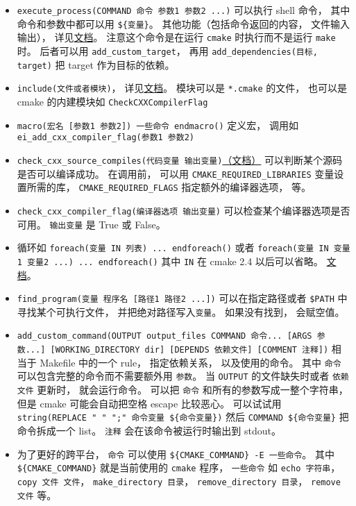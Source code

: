 \begin{itemize}
\item \verb`execute_process(COMMAND 命令 参数1 参数2 ...)` 可以执行 shell 命令， 其中命令和参数中都可以用 \verb`${变量}`。 其他功能（包括命令返回的内容， 文件输入输出）， 详见\href{https://cmake.org/cmake/help/latest/command/execute_process.html}{文档}。 注意这个命令是在运行 \verb`cmake` 时执行而不是运行 \verb`make` 时。 后者可以用 \verb`add_custom_target`， 再用 \verb`add_dependencies(目标, target)` 把 target 作为目标的依赖。
\item \verb`include(文件或者模块)`， 详见\href{https://cmake.org/cmake/help/latest/command/include.html}{文档}。 模块可以是 \verb`*.cmake` 的文件， 也可以是 cmake 的内建模块如 \verb`CheckCXXCompilerFlag`
\item \verb`macro(宏名 [参数1 参数2]) 一些命令 endmacro()` 定义宏， 调用如 \verb`ei_add_cxx_compiler_flag(参数1 参数2)`
\item \verb`check_cxx_source_compiles(代码变量 输出变量)`\href{https://cmake.org/cmake/help/latest/module/CheckCXXSourceCompiles.html}{（文档）} 可以判断某个源码是否可以编译成功。 在调用前， 可以用 \verb`CMAKE_REQUIRED_LIBRARIES` 变量设置所需的库， \verb`CMAKE_REQUIRED_FLAGS` 指定额外的编译器选项， 等。
\item \verb`check_cxx_compiler_flag(编译器选项 输出变量)` 可以检查某个编译器选项是否可用。 \verb`输出变量` 是 True 或 False。
\item 循环如 \verb`foreach(变量 IN 列表) ... endforeach()` 或者 \verb`foreach(变量 IN 变量1 变量2 ...) ... endforeach()` 其中 \verb`IN` 在 cmake 2.4 以后可以省略。 \href{https://cmake.org/cmake/help/latest/command/foreach.html}{文档}。
\item \verb`find_program(变量 程序名 [路径1 路径2 ...])` 可以在指定路径或者 \verb`$PATH` 中寻找某个可执行文件， 并把绝对路径写入\verb`变量`。 如果没有找到， 会赋空值。
\item \verb`add_custom_command(OUTPUT output_files COMMAND 命令... [ARGS 参数...] [WORKING_DIRECTORY dir] [DEPENDS 依赖文件] [COMMENT 注释])` 相当于 Makefile 中的一个 rule， 指定依赖关系， 以及使用的命令。 其中 \verb`命令` 可以包含完整的命令而不需要额外用 \verb`参数`。 当 \verb`OUTPUT` 的文件缺失时或者 \verb`依赖文件` 更新时， 就会运行命令。 可以把 \verb`命令` 和所有的参数写成一整个字符串， 但是 cmake 可能会自动把空格 escape 比较恶心。 可以试试用 \verb`string(REPLACE " " ";" 命令变量 ${命令变量})` 然后 \verb`COMMAND ${命令变量}` 把命令拆成一个 list。 \verb`注释` 会在该命令被运行时输出到 stdout。
\item 为了更好的跨平台， \verb`命令` 可以使用 \verb`${CMAKE_COMMAND} -E 一些命令`。 其中 \verb`${CMAKE_COMMAND}` 就是当前使用的 \verb`cmake` 程序， \verb`一些命令` 如 \verb`echo 字符串`，\verb`copy 文件 文件`， \verb`make_directory 目录`， \verb`remove_directory 目录`， \verb`remove 文件` 等。

\end{itemize}
